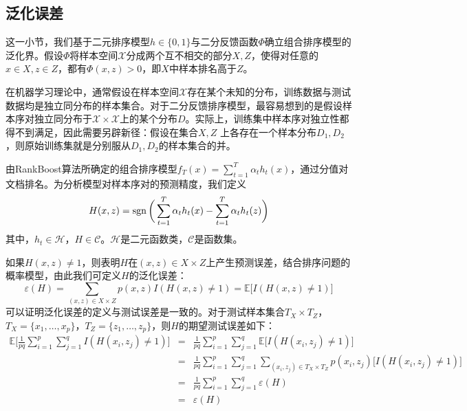 \subsection{泛化误差}
这一小节，我们基于二元排序模型$h\in\{0,1\}$与二分反馈函数$\varPhi$确立组合排序模型的泛化界。假设$\varPhi$将样本空间$\mathcal{X}$分成两个互不相交的部分$X, Z$，使得对任意的$x\in X, z\in Z$，都有$\varPhi(x,z) > 0$，即$X$中样本排名高于$Z$。

在机器学习理论中，通常假设在样本空间$\mathcal{X}$存在某个未知的分布，训练数据与测试数据均是独立同分布的样本集合。对于二分反馈排序模型，最容易想到的是假设样本序对独立同分布于$\mathcal{X}\times \mathcal{X}$上的某个分布$D$。实际上，训练集中样本序对独立性都得不到满足，因此需要另辟新径：假设在集合$X,Z$ 上各存在一个样本分布$D_1,D_2$，则原始训练集就是分别服从$D_1,D_2$的样本集合的并。%

由RankBoost算法所确定的组合排序模型$f_T(x) = \sum\limits_{t=1}^T \alpha_t h_t(x)$，通过分值对文档排名。为分析模型对样本序对的预测精度，我们定义
\begin{equation}
    H(x,z) = \operatorname{\mathrm{sgn}}\bigg(\sum\limits_{t=1}^T \alpha_t h_t(x) - \sum\limits_{t=1}^T \alpha_t h_t(z)\bigg)
\end{equation}
其中，$h_t\in \mathcal{H}$，$H\in \mathcal{C}$。$\mathcal{H}$是二元函数类，$\mathcal{C}$是函数集。

如果$H(x,z)\ne 1$，则表明$H$在$(x,z)\in X\times Z$上产生预测误差，结合排序问题的概率模型，由此我们可定义$H$的泛化误差：
\begin{equation}
    \varepsilon(H) = \sum\limits_{(x,z)\in X\times Z} p(x, z) I(H(x,z)\ne 1) = \mathbb{E}\bigg[I(H(x,z)\ne 1)\bigg]
\end{equation}
可以证明泛化误差的定义与测试误差是一致的。对于测试样本集合$T_X\times T_Z$，$T_X=\{x_1,\ldots,x_p\}$，$T_Z=\{z_1,\ldots,z_p\}$，则$H$的期望测试误差如下：
\begin{equation}
    \begin{array}{lll}
      \mathbb{E}\bigg[\frac{1}{pq} \sum\limits_{i=1}^p\sum\limits_{j=1}^q I(H(x_i,z_j)\ne 1) \bigg] & = & \frac{1}{pq} \sum\limits_{i=1}^p\sum\limits_{j=1}^q \mathbb{E}\bigg[I(H(x_i,z_j)\ne 1)\bigg] \\
      & = & \frac{1}{pq} \sum\limits_{i=1}^p\sum\limits_{j=1}^q \sum\limits_{(x_i,z_j)\in T_X\times T_Z} p(x_i, z_j) \bigg[I(H(x_i,z_j)\ne 1)\bigg] \\
      & = & \frac{1}{pq} \sum\limits_{i=1}^p\sum\limits_{j=1}^q \varepsilon(H) \\
      & = & \varepsilon(H)
    \end{array}
\end{equation}

